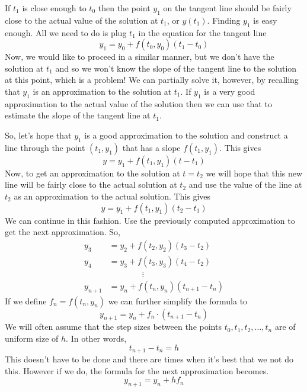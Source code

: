 \documentclass[10pt,reqno]{book}
\theoremstyle{definition}
\begin{document}
	\noindent If $ t_1 $ is close enough to $ t_0 $ then the point $ y_1 $ on the tangent line should be fairly close to the actual value of the solution at $ t_1 $, or $ y(t_1) $. Finding $ y_1 $ is easy enough. All we need to do is plug $ t_1 $ in the equation for the tangent line
	\[ y_1 = y_0 + f(t_0,y_0)(t_1-t_0) \]
	Now, we would like to proceed in a similar manner, but we don't have the solution at $ t_1 $ and so we won't know the slope of the tangent line to the solution at this point, which is a problem! We can partially solve it, however, by recalling that $ y_1 $ is an approximation to the solution at $ t_1 $. If $ y_1 $ is a very good approximation to the actual value of the solution then we can use that to estimate the slope of the tangent line at $ t_1 $.

	\noindent So, let's hope that $ y_1 $ is a good approximation to the solution and construct a line through the point $ (t_1,y_1) $ that has a slope $ f(t_1,y_1) $. This gives
	\[ y = y_1 + f(t_1,y_1)(t-t_1) \]
	Now, to get an approximation to the solution at $ t = t_2 $ we will hope that this new line will be fairly close to the actual solution at $ t_2 $ and use the value of the line at $ t_2 $ as an approximation to the actual solution. This gives
	\[ y = y_1 + f(t_1,y_1)(t_2-t_1) \]
	We can continue in this fashion. Use the previously computed approximation to get the next approximation. So,
	\begin{align*}
		y_3 &= y_2+f(t_2,y_2)(t_3-t_2)\\
		y_4 &= y_3+f(t_3,y_3)(t_4-t_2)\\
		& \qquad \qquad \vdots\\
		y_{n+1} &= y_n + f(t_n,y_n)(t_{n+1}-t_n)
	\end{align*}
	If we define $ f_n = f(t_n,y_n) $ we can further simplify the formula to
	\[ y_{n+1} = y_n + f_n \cdot (t_{n+1} - t_n) \]
	We will often assume that the step sizes between the points $ t_0,t_1,t_2, \dots, t_n $ are of uniform size of $ h $. In other words,
	\[ t_{n+1} - t_n = h \]
	This doesn’t have to be done and there are times when it’s best that we not do this.  However if we do, the formula for the next approximation becomes.
	\begin{equation}
		y_{n+1} = y_n + hf_n
	\end{equation}
\end{document}
